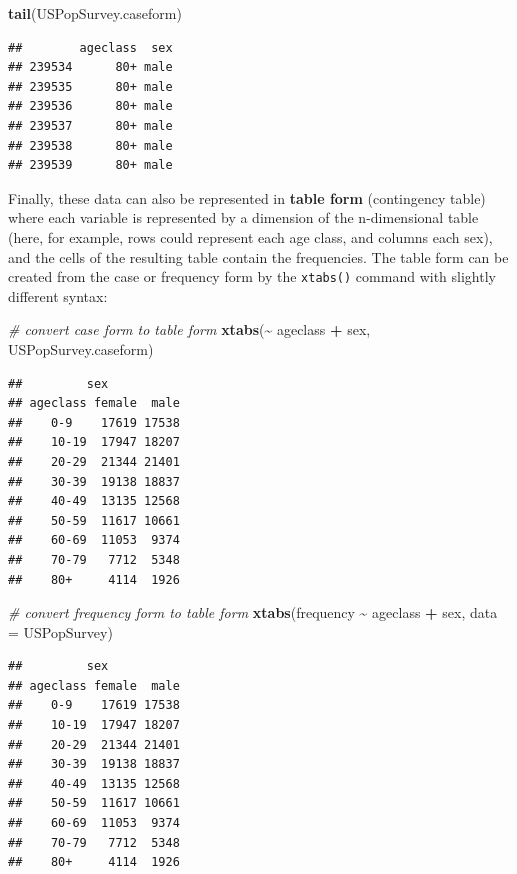 \documentclass[
  12pt,
]{book}
\newenvironment{Shaded}{\begin{snugshade}}{\end{snugshade}}
\newcommand{\CommentTok}[1]{\textcolor[rgb]{0.56,0.35,0.01}{\textit{#1}}}
\newcommand{\DataTypeTok}[1]{\textcolor[rgb]{0.13,0.29,0.53}{#1}}
\newcommand{\KeywordTok}[1]{\textcolor[rgb]{0.13,0.29,0.53}{\textbf{#1}}}
\newcommand{\NormalTok}[1]{#1}
\newcommand{\OperatorTok}[1]{\textcolor[rgb]{0.81,0.36,0.00}{\textbf{#1}}}
\newcommand{\StringTok}[1]{\textcolor[rgb]{0.31,0.60,0.02}{#1}}
\begin{document}
\begin{Shaded}
\begin{Highlighting}[]
\KeywordTok{tail}\NormalTok{(USPopSurvey.caseform)}
\end{Highlighting}
\end{Shaded}

\begin{verbatim}
##        ageclass  sex
## 239534      80+ male
## 239535      80+ male
## 239536      80+ male
## 239537      80+ male
## 239538      80+ male
## 239539      80+ male
\end{verbatim}

Finally, these data can also be represented in \textbf{table form} (contingency table) where each variable is represented by a dimension of the n-dimensional table (here, for example, rows could represent each age class, and columns each sex), and the cells of the resulting table contain the frequencies. The table form can be created from the case or frequency form by the \texttt{xtabs()} command with slightly different syntax:

\begin{Shaded}
\begin{Highlighting}[]
\CommentTok{\# convert case form to table form}
\KeywordTok{xtabs}\NormalTok{(}\OperatorTok{\textasciitilde{}}\StringTok{ }\NormalTok{ageclass }\OperatorTok{+}\StringTok{ }\NormalTok{sex, USPopSurvey.caseform)}
\end{Highlighting}
\end{Shaded}

\begin{verbatim}
##         sex
## ageclass female  male
##    0-9    17619 17538
##    10-19  17947 18207
##    20-29  21344 21401
##    30-39  19138 18837
##    40-49  13135 12568
##    50-59  11617 10661
##    60-69  11053  9374
##    70-79   7712  5348
##    80+     4114  1926
\end{verbatim}

\begin{Shaded}
\begin{Highlighting}[]
\CommentTok{\# convert frequency form to table form}
\KeywordTok{xtabs}\NormalTok{(frequency }\OperatorTok{\textasciitilde{}}\StringTok{ }\NormalTok{ageclass }\OperatorTok{+}\StringTok{ }\NormalTok{sex, }\DataTypeTok{data =}\NormalTok{ USPopSurvey)}
\end{Highlighting}
\end{Shaded}

\begin{verbatim}
##         sex
## ageclass female  male
##    0-9    17619 17538
##    10-19  17947 18207
##    20-29  21344 21401
##    30-39  19138 18837
##    40-49  13135 12568
##    50-59  11617 10661
##    60-69  11053  9374
##    70-79   7712  5348
##    80+     4114  1926
\end{verbatim}
\end{document}
